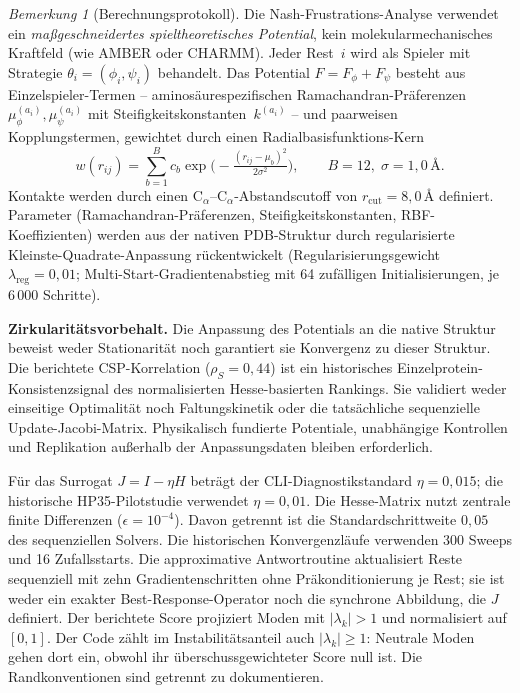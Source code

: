 \documentclass[12pt,a4paper]{article}
\theoremstyle{remark}
\newtheorem{remark}{Bemerkung}
\begin{document}
\begin{remark}[Berechnungsprotokoll]\label{rem:comp-protocol}
Die Nash-Frustrations-Analyse verwendet ein \emph{maßgeschneidertes spieltheoretisches Potential}, kein molekularmechanisches Kraftfeld (wie AMBER oder CHARMM).
Jeder Rest~$i$ wird als Spieler mit Strategie $\theta_i = (\phi_i, \psi_i)$ behandelt.
Das Potential $F = F_\phi + F_\psi$ besteht aus Einzelspieler-Termen -- aminosäurespezifischen Ramachandran-Präferenzen $\mu_\phi^{(a_i)}, \mu_\psi^{(a_i)}$ mit Steifigkeitskonstanten~$k^{(a_i)}$ -- und paarweisen Kopplungstermen, gewichtet durch einen Radialbasisfunktions-Kern
\[
  w(r_{ij}) = \sum_{b=1}^{B} c_b \exp\!\bigl(-\tfrac{(r_{ij}-\mu_b)^2}{2\sigma^2}\bigr),
  \qquad B=12,\; \sigma = 1{,}0\,\text{\AA}.
\]
Kontakte werden durch einen C$_\alpha$--C$_\alpha$-Abstandscutoff von $r_\text{cut} = 8{,}0$\,\AA{} definiert.
Parameter (Ramachandran-Präferenzen, Steifigkeitskonstanten, RBF-Koeffizienten) werden aus der nativen PDB-Struktur durch regularisierte Kleinste-Quadrate-Anpassung rückentwickelt (Regularisierungsgewicht $\lambda_{\text{reg}} = 0{,}01$; Multi-Start-Gradientenabstieg mit 64 zufälligen Initialisierungen, je 6\,000 Schritte).

\textbf{Zirkularitätsvorbehalt.} Die Anpassung des Potentials an die native Struktur beweist weder Stationarität noch garantiert sie Konvergenz zu dieser Struktur. Die berichtete CSP-Korrelation ($\rho_S=0{,}44$) ist ein historisches Einzelprotein-Konsistenzsignal des normalisierten Hesse-basierten Rankings. Sie validiert weder einseitige Optimalität noch Faltungskinetik oder die tatsächliche sequenzielle Update-Jacobi-Matrix. Physikalisch fundierte Potentiale, unabhängige Kontrollen und Replikation außerhalb der Anpassungsdaten bleiben erforderlich.

Für das Surrogat $J=I-\eta H$ beträgt der CLI-Diagnostikstandard $\eta=0{,}015$; die historische HP35-Pilotstudie verwendet $\eta=0{,}01$. Die Hesse-Matrix nutzt zentrale finite Differenzen ($\epsilon=10^{-4}$). Davon getrennt ist die Standardschrittweite $0{,}05$ des sequenziellen Solvers.
Die historischen Konvergenzläufe verwenden 300 Sweeps und 16 Zufallsstarts. Die approximative Antwortroutine aktualisiert Reste sequenziell mit zehn Gradientenschritten ohne Präkonditionierung je Rest; sie ist weder ein exakter Best-Response-Operator noch die synchrone Abbildung, die $J$ definiert.
Der berichtete Score projiziert Moden mit $|\lambda_k|>1$ und normalisiert auf $[0,1]$. Der Code zählt im Instabilitätsanteil auch $|\lambda_k|\geq1$: Neutrale Moden gehen dort ein, obwohl ihr überschussgewichteter Score null ist. Die Randkonventionen sind getrennt zu dokumentieren.


\end{remark}
\end{document}
